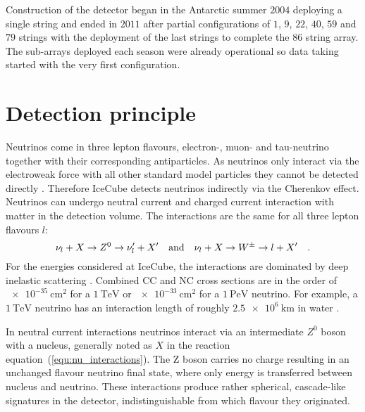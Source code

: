Construction of the detector began in the Antarctic summer $\num{2004}$ deploying a single string and ended in $\num{2011}$ after partial configurations of $\num{1}$, $\num{9}$, $\num{22}$, $\num{40}$, $\num{59}$ and $\num{79}$ strings with the deployment of the last strings to complete the $\num{86}$ string array.
The sub-arrays deployed each season were already operational so data taking started with the very first configuration.

\section{Detection principle}
Neutrinos come in three lepton flavours, electron-, muon- and tau-neutrino together with their corresponding antiparticles.
As neutrinos only interact via the electroweak force with all other standard model particles they cannot be detected directly .
Therefore IceCube detects neutrinos indirectly via the Cherenkov effect.
Neutrinos can undergo neutral current and charged current interaction with matter in the detection volume.
The interactions are the same for all three lepton flavours $l$:
\begin{equation}
  \label{equ:nu_interactions}
  \nu_l + X \rightarrow Z^0 \rightarrow \nu'_l + X'
  \quad\text{and}\quad
  \nu_l + X \rightarrow W^{\pm} \rightarrow l + X'
  \quad\text{.}
\end{equation}
For the energies considered at IceCube, the interactions are dominated by deep inelastic scattering .
Combined CC and NC cross sections are in the order of $\SI{e-35}{\cm\squared}$ for a $\SI{1}{\TeV}$ or $\SI{e-33}{\cm\squared}$ for a $\SI{1}{\peta\eV}$ neutrino.
For example, a $\SI{1}{\TeV}$ neutrino has an interaction length of roughly $\SI{2.5e6}{\km}$ in water .

In neutral current interactions neutrinos interact via an intermediate $Z^0$ boson with a nucleus, generally noted as $X$ in the reaction equation~(\ref{equ:nu_interactions}).
The Z boson carries no charge resulting in an unchanged flavour neutrino final state, where only energy is transferred between nucleus and neutrino.
These interactions produce rather spherical, cascade-like signatures in the detector, indistinguishable from which flavour they originated.

